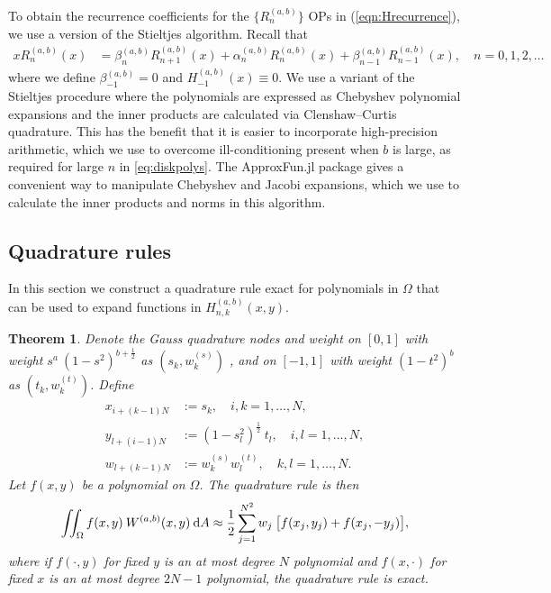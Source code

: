 \documentclass[11pt, oneside]{article}   	%
\newcommand{\half}{\frac{1}{2}}
\newcommand{\hdop}{H}
\newcommand{\hdopnkab}{\hdop_{n,k}^{(a,b)}}
\newcommand{\Wab}{{W^{(a,b)}}}
\newcommand{\genjac}{R}
\newtheorem{theorem}{Theorem}
\begin{document}
To obtain the recurrence coefficients for the $\{\genjac_n^{(a,b)}\}$ OPs in (\ref{eqn:Hrecurrence}), we use a version of the Stieltjes algorithm. Recall that
\begin{align*}
x \genjac_n^{(a,b)}(x) &= \beta_n^{(a,b)} \genjac_{n+1}^{(a,b)}(x) + \alpha_n^{(a,b)} \genjac_n^{(a,b)}(x) + \beta_{n-1}^{(a,b)} \genjac_{n-1}^{(a,b)}(x), \quad n = 0,1,2,\dots
\end{align*}
where we define $\beta_{-1}^{(a,b)} = 0$ and $H_{-1}^{(a,b)}(x) \equiv 0$. We use a variant of the Stieltjes procedure \cite{gautschi1982generating} where the polynomials are expressed as Chebyshev polynomial expansions and the inner products are calculated via Clenshaw--Curtis quadrature. This has the benefit that it is easier to incorporate high-precision arithmetic, which we use to overcome ill-conditioning present when $b$ is large, as required for large $n$ in \eqref{eq:diskpolys}. The ApproxFun.jl \cite{ApproxFun} package gives a convenient way to manipulate Chebyshev and Jacobi expansions, which we use to calculate the inner products and norms in this algorithm.


\subsection{Quadrature rules}

In this section we construct a quadrature rule exact for polynomials in $\Omega$ that can be used to expand functions in $\hdopnkab(x,y)$. 

\begin{theorem}

Denote the  Gauss quadrature nodes and weight on \([0,1]\) with weight \(s^a \: (1-s^2)^{b+\half}\) as $(s_k,w_k^{(s)})$ , and
 on \([-1,1]\) with weight \((1-t^2)^b\) as $(t_k,w_k^{(t)})$. Define
\begin{align*}
x_{i+(k-1)N} &:= s_k, \quad i,k = 1,\dots,N, \\
y_{l+(i-1)N} &:= (1-s_l^2)^\half \: t_l, \quad i,l = 1,\dots,N, \\
w_{l+(k-1)N} &:= w_k^{(s)} w_l^{(t)}, \quad k,l = 1,\dots,N.
\end{align*}
Let $f(x,y)$ be a polynomial on $\Omega$. The quadrature rule is then
$$
\iint_\Omega f(x,y) \: \Wab(x,y) \: \D A \approx \half \sum_{j=1}^{N^2} w_j \: \big[ f(x_j, y_j) + f(x_j, -y_j) \big],
$$
where if $f(\cdot, y)$ for fixed $y$ is an at most degree $N$ polynomial and $f(x, \cdot)$ for fixed $x$  is an at most degree $2N-1$ polynomial, the quadrature rule is exact.
\end{theorem}
\end{document}
